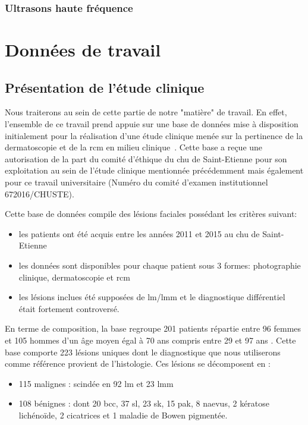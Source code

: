 \subsubsection{Ultrasons haute fréquence}

\clearpage
\section{Données de travail}
\subsection{Présentation de l'étude clinique}
Nous traiterons au sein de cette partie de notre "matière" de travail. En effet, l'ensemble de ce travail prend appuie sur une base de données mise à disposition initialement pour la réalisation d'une étude clinique menée sur la pertinence de la dermatoscopie et de la \gls{rcm} en milieu clinique~\cite{Cinotti2018}. Cette base a reçue une autorisation de la part du comité d'éthique du \gls{chu} de Saint-Etienne pour son exploitation au sein de l'étude clinique mentionnée précédemment mais également pour ce travail universitaire (Numéro du comité d'examen institutionnel 672016/CHUSTE).\par

Cette base de données compile des lésions faciales possédant les critères suivant:
\begin{itemize}
\item les patients ont été acquis entre les années 2011 et 2015 au \gls{chu} de Saint-Etienne
\item les données sont disponibles pour chaque patient sous 3 formes: photographie clinique, dermatoscopie et \gls{rcm}
\item les lésions inclues été supposées de \gls{lm}/\gls{lmm} et le diagnostique différentiel était fortement controversé.
\end{itemize}\par

En terme de composition, la base regroupe 201 patients répartie entre 96 femmes et 105 hommes d'un âge moyen égal à 70 ans compris entre 29 et 97 ans . Cette base comporte 223 lésions uniques dont le diagnostique que nous utiliserons comme référence provient de l'histologie. Ces lésions se décomposent en :
\begin{itemize}
\item 115 malignes : scindée en 92 \gls{lm} et 23 \gls{lmm}
\item 108 bénignes : dont 20 \gls{bcc}, 37 \gls{sl}, 23 \gls{sk}, 15 \gls{pak}, 8 naevus, 2 kératose lichénoïde, 2 cicatrices et 1 maladie de Bowen pigmentée.
\end{itemize}\par

